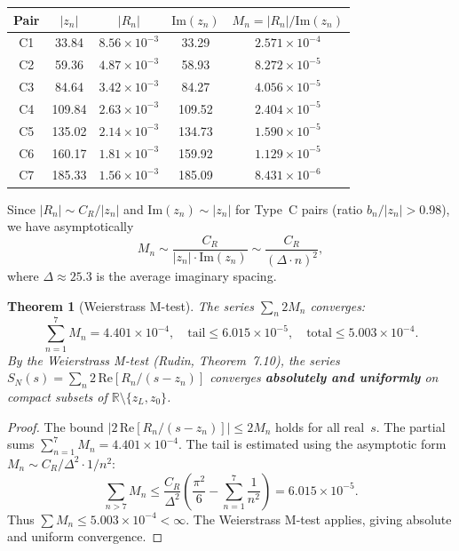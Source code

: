 \documentclass[11pt,a4paper]{article}
\newcommand{\Imag}{\mathrm{Im}}
\newcommand{\Real}{\mathrm{Re}}
\newtheorem{theorem}{Theorem}[section]
\begin{document}
\begin{center}
\begin{tabular}{ccccc}
\toprule
Pair & $|z_n|$ & $|R_n|$ & $\Imag(z_n)$ & $M_n = |R_n|/\Imag(z_n)$ \\
\midrule
C1 & 33.84 & $8.56\times 10^{-3}$ & 33.29 & $2.571\times 10^{-4}$ \\
C2 & 59.36 & $4.87\times 10^{-3}$ & 58.93 & $8.272\times 10^{-5}$ \\
C3 & 84.64 & $3.42\times 10^{-3}$ & 84.27 & $4.056\times 10^{-5}$ \\
C4 & 109.84 & $2.63\times 10^{-3}$ & 109.52 & $2.404\times 10^{-5}$ \\
C5 & 135.02 & $2.14\times 10^{-3}$ & 134.73 & $1.590\times 10^{-5}$ \\
C6 & 160.17 & $1.81\times 10^{-3}$ & 159.92 & $1.129\times 10^{-5}$ \\
C7 & 185.33 & $1.56\times 10^{-3}$ & 185.09 & $8.431\times 10^{-6}$ \\
\bottomrule
\end{tabular}
\end{center}

\noindent
Since $|R_n| \sim C_R/|z_n|$ and $\Imag(z_n) \sim |z_n|$ for Type~C
pairs (ratio $b_n/|z_n| > 0.98$), we have asymptotically
\begin{equation}
  M_n \sim \frac{C_R}{|z_n|\cdot\Imag(z_n)}
  \sim \frac{C_R}{(\Delta\cdot n)^2},
\end{equation}
where $\Delta \approx 25.3$ is the average imaginary spacing.

\begin{theorem}[Weierstrass M-test]
\label{thm:Mtest}
The series $\sum_n 2M_n$ converges:
\begin{equation}
  \sum_{n=1}^{7} M_n = 4.401 \times 10^{-4}, \quad
  \text{tail} \leq 6.015 \times 10^{-5}, \quad
  \text{total} \leq 5.003 \times 10^{-4}.
\end{equation}
By the Weierstrass M-test \textnormal{(Rudin, Theorem~7.10)}, the series
$S_N(s) = \sum_n 2\,\Real[R_n/(s-z_n)]$ converges \textbf{absolutely and
uniformly} on compact subsets of\/
$\mathbb{R}\setminus\{z_L, z_0\}$.
\end{theorem}

\begin{proof}
The bound $|2\,\Real[R_n/(s-z_n)]| \leq 2M_n$ holds for all real~$s$.
The partial sums $\sum_{n=1}^{7} M_n = 4.401\times 10^{-4}$.  The tail
is estimated using the asymptotic form
$M_n \sim C_R/\Delta^2 \cdot 1/n^2$:
\[
  \sum_{n > 7} M_n
  \leq \frac{C_R}{\Delta^2}
  \left(\frac{\pi^2}{6} - \sum_{n=1}^{7} \frac{1}{n^2}\right)
  = 6.015 \times 10^{-5}.
\]
Thus $\sum M_n \leq 5.003 \times 10^{-4} < \infty$.  The Weierstrass
M-test applies, giving absolute and uniform convergence.
\end{proof}
\end{document}
